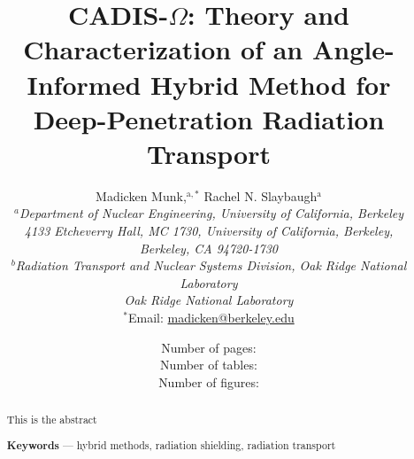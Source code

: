 \documentclass{article}                                                                           %
\begin{document}

\title{CADIS-$\Omega$: Theory and Characterization of an Angle-Informed Hybrid
Method for Deep-Penetration Radiation Transport} %

\author{
\vspace{20mm}
Madicken Munk,$^{\text{a},\ast}$ Rachel N. Slaybaugh$^{\text{a}}$ \\[4pt] %
\textit{$^a$Department of Nuclear Engineering, University of California,
Berkeley}\\[-10pt]       %
\textit{4133 Etcheverry Hall, MC 1730, University of California, Berkeley,}\\ [-10pt]
\textit{Berkeley, CA 94720-1730} \\ [-5pt]
\textit{$^b$Radiation Transport and Nuclear Systems Division, Oak Ridge National
Laboratory} \\ [-10pt]
\textit{Oak Ridge National Laboratory} \\ [-10pt]
{$^\ast$Email: \href{mailto:madicken@berkeley.edu}{madicken@berkeley.edu}}}       %

\date{                               %
\vspace{40mm}
Number of pages: \pageref*{LastPage} \\
Number of tables: \totaltables \\
Number of figures: \totalfigures
}

\clearpage\maketitle
\thispagestyle{empty}


\pagebreak
~\vfill


\begin{abstract}
This is the abstract

\vspace{1em}\noindent\textbf{Keywords} ---
hybrid methods, radiation shielding, radiation transport
\end{abstract}
\end{document}
